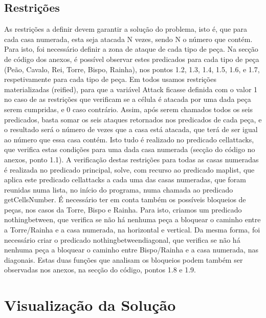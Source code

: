 \documentclass[runningheads]{llncs}
\begin{document}
\subsection{Restrições}
    As restrições a definir devem garantir a solução do problema, isto é, que para cada casa numerada, esta seja atacada N vezes, sendo N o número que contém. Para isto, foi necessário definir a zona de ataque de cada tipo de peça.
    Na secção de código dos anexos, é possível observar estes predicados para cada tipo de peça (Peão, Cavalo, Rei, Torre, Bispo, Rainha), nos pontos 1.2, 1.3, 1.4, 1.5, 1.6, e 1.7, respetivamente para cada tipo de peça. Em todos usamos restrições materializadas (reified), para que a variável Attack ficasse definida com o valor 1 no caso de as restrições que verificam se a célula é atacada por uma dada peça serem cumpridas, e 0 caso contrário.
    Assim, após serem chamados todos os seis predicados, basta somar os seis ataques retornados nos predicados de cada peça, e o resultado será o número de vezes que a casa está atacada, que terá de ser igual ao número que essa casa contém.
    Isto tudo é realizado no predicado cell\textunderscore attacks, que verifica estas condições para uma dada casa numerada (secção do código no anexos, ponto 1.1). A verificação destas restrições para todas as casas numeradas é realizada no predicado principal, solve, com recurso ao predicado maplist, que aplica este predicado cell\textunderscore attacks a cada uma das casas numeradas, que foram reunidas numa lista, no início do programa, numa chamada ao predicado getCellsNumber.
    É necessário ter em conta também os possíveis bloqueios de peças, nos casos da Torre, Bispo e Rainha. Para isto, criamos um predicado nothing\textunderscore between, que verifica se não há nenhuma peça a bloquear o caminho entre a Torre/Rainha e a casa numerada, na horizontal e vertical.
    Da mesma forma, foi necessário criar o predicado nothing\textunderscore between\textunderscore diagonal, que verifica se não há nenhuma peça a bloquear o caminho entre Bispo/Rainha e a casa numerada, nas diagonais.
    Estas duas funções que analisam os bloqueios podem também ser observadas nos anexos, na secção do código, pontos 1.8 e 1.9.

\section{Visualização da Solução}
\end{document}
